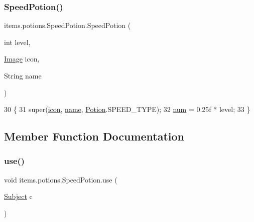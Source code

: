 \subsubsection{\texorpdfstring{Speed\+Potion()}{SpeedPotion()}\hspace{0.1cm}{\footnotesize\ttfamily [2/2]}}
{\footnotesize\ttfamily items.\+potions.\+Speed\+Potion.\+Speed\+Potion (\begin{DoxyParamCaption}\item[{int}]{level,  }\item[{\mbox{\hyperlink{classorg_1_1newdawn_1_1slick_1_1_image}{Image}}}]{icon,  }\item[{String}]{name }\end{DoxyParamCaption})\hspace{0.3cm}{\ttfamily [inline]}}


\begin{DoxyCode}
30                                                            \{
31         super(\mbox{\hyperlink{classitems_1_1_item_afa445ad011d48c3455b0c04bec2581f9}{icon}}, \mbox{\hyperlink{classitems_1_1_item_a086327df1ba046bbbe3fa2f753226d73}{name}}, \mbox{\hyperlink{classitems_1_1_potion_ab2a46630762ff8d852c72333029252e5}{Potion}}.SPEED\_TYPE);
32         \mbox{\hyperlink{classitems_1_1potions_1_1_speed_potion_aea1ee6c20166ae724fc8218fc990d4f2}{num}} = 0.25f * level;
33     \}
\end{DoxyCode}


\subsection{Member Function Documentation}
\mbox{\label{classitems_1_1potions_1_1_speed_potion_ad9b7c55659e5eb0a43b2a4b3f164d3aa}} 
\subsubsection{\texorpdfstring{use()}{use()}}
{\footnotesize\ttfamily void items.\+potions.\+Speed\+Potion.\+use (\begin{DoxyParamCaption}\item[{\mbox{\hyperlink{classentities_1_1_subject}{Subject}}}]{c }\end{DoxyParamCaption})\hspace{0.3cm}{\ttfamily [inline]}}


